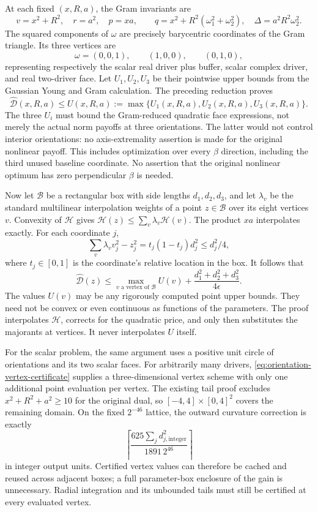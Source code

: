 At each fixed $(x,R,a)$, the Gram invariants are
\[
 v=x^2+R^2,\quad r=a^2,\quad p=xa,\qquad
 q=x^2+R^2(\omega_1^2+\omega_2^2),\quad
 \Delta=a^2R^2\omega_2^2.
\]
The squared components of $\omega$ are precisely barycentric coordinates
of the Gram triangle.  Its three vertices are
\[
 \omega=(0,0,1),\qquad(1,0,0),\qquad(0,1,0),
\]
representing respectively the scalar real driver plus buffer, scalar
complex driver, and real two-driver face.  Let $U_1,U_2,U_3$ be their
pointwise upper bounds from the Gaussian Young and Gram calculation.
The preceding reduction proves
\[
 \widehat{\mathcal D}(x,R,a)\le
 U(x,R,a):=\max\{U_1(x,R,a),U_2(x,R,a),U_3(x,R,a)\}.
\]
The three $U_i$ must bound the Gram-reduced quadratic face expressions,
not merely the actual norm payoffs at three orientations.  The latter
would not control interior orientations: no axis-extremality assertion is
made for the original nonlinear payoff.  This includes optimization over
every $\beta$ direction, including the third unused baseline coordinate.  No assertion that the original
nonlinear optimum has zero perpendicular $\beta$ is needed.

Now let $\mathcal B$ be a rectangular box with side lengths
$d_1,d_2,d_3$, and let $\lambda_v$ be the standard multilinear interpolation
weights of a point $z\in\mathcal B$ over its eight vertices $v$.  Convexity
of $\mathcal H$ gives
$\mathcal H(z)\le\sum_v\lambda_v\mathcal H(v)$.
The product $xa$ interpolates exactly.  For each coordinate $j$,
\[
 \sum_v\lambda_vv_j^2-z_j^2
 =t_j(1-t_j)d_j^2\le d_j^2/4,
\]
where $t_j\in[0,1]$ is the coordinate's relative location in the box.
It follows that
\begin{equation}
 \boxed{\quad
 \widehat{\mathcal D}(z)
 \le \max_{v\text{ a vertex of }\mathcal B}U(v)
          +\frac{d_1^2+d_2^2+d_3^2}{4\epsilon}.
 \quad}
 \label{eq:orientation-vertex-certificate}
\end{equation}
The values $U(v)$ may be any rigorously computed point upper bounds.
They need not be convex or even continuous as functions of the parameters.
The proof interpolates $\mathcal H$, corrects for the quadratic price, and
only then substitutes the majorants at vertices.  It never interpolates
$U$ itself.

For the scalar problem, the same argument uses a positive unit circle of
orientations and its two scalar faces.  For arbitrarily many drivers,
\eqref{eq:orientation-vertex-certificate} supplies a three-dimensional
vertex scheme with only one additional point evaluation per vertex.
The existing tail proof excludes $x^2+R^2+a^2\ge10$ for the original dual,
so $[-4,4]\times[0,4]^2$ covers the remaining domain.  On the fixed
$2^{-46}$ lattice, the outward curvature correction is exactly
\[
 \left\lceil
 \frac{625\sum_j d_{j,\mathrm{integer}}^2}{1891\,2^{46}}
 \right\rceil
\]
in integer output units.  Certified vertex values can therefore be cached
and reused across adjacent boxes; a full parameter-box enclosure of the
gain is unnecessary.  Radial integration and its unbounded tails must
still be certified at every evaluated vertex.

